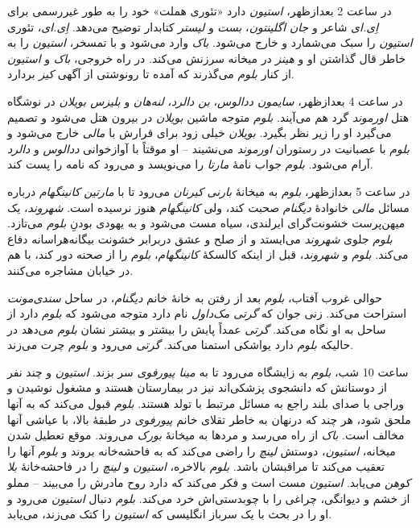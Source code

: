 \documentclass[12pt]{book}
\newcommand{\noun}[1]{\textit{\textcolor{black!70}{#1}}}
\begin{document}
    در ساعت 2 بعدازظهر، \noun{استیون} دارد «تئوری هملت» خود را به طور غیررسمی برای \noun{اِی.ای} شاعر و \noun{جان اگلینتون}، \noun{بست} و \noun{لیستر} کتابدار توضیح می‌دهد. \noun{اِی.ای}، تئوری \noun{استیون} را سبک می‌شمارد و خارج می‌شود. \noun{باک} وارد می‌شود و با تمسخر، \noun{استیون} را به خاطر قال گذاشتن او و \noun{هینز} در میخانه سرزنش می‌کند. در راه خروجی، \noun{باک} و \noun{استیون} از کنار \noun{بلوم} می‌گذرند که آمده تا رونوشتی از آگهی \noun{کیز} بردارد.

    در ساعت 4 بعدازظهر، \noun{سایمون ددالوس}، \noun{بن دالرد}، \noun{لنه‌هان} و \noun{بلیزس بویلان} در نوشگاه هتل \noun{اورموند} گرد هم می‌آیند. \noun{بلوم} متوجه ماشین \noun{بویلان} در بیرون هتل می‌شود و تصمیم می‌گیرد او را زیر نظر بگیرد. \noun{بویلان} خیلی زود برای قرارش با \noun{مالی} خارج می‌شود و \noun{بلوم} با عصبانیت در رستوران \noun{اورموند} می‌نشیند – او موقتاً با آوازخوانی \noun{ددالوس} و \noun{دالرد} آرام می‌شود. \noun{بلوم} جواب نامۀ \noun{مارتا} را می‌نویسد و می‌رود که نامه را پست کند.

    در ساعت 5 بعدازظهر، \noun{بلوم} به میخانۀ \noun{بارنی کیرنان} می‌رود تا با \noun{مارتین کانینگهام} درباره مسائل \noun{مالی} خانوادۀ \noun{دیگنام} صحبت کند، ولی \noun{کانینگهام} هنوز نرسیده است. \noun{شهروند}، یک میهن‌پرست خشونت‌گرای ایرلندی، سیاه مست می‌شود و به یهودی بودنِ \noun{بلوم} می‌تازد. \noun{بلوم} جلوی \noun{شهروند} می‌ایستد و از صلح و عشق دربرابر خشونت بیگانه‌هراسانه دفاع می‌کند. \noun{بلوم} و \noun{شهروند}، قبل از اینکه کالسکۀ \noun{کانینگهام}، \noun{بلوم} را از صحنه دور کند، با هم در خیابان مشاجره می‌کنند.

    حوالی غروب آفتاب، \noun{بلوم} بعد از رفتن به خانۀ خانم \noun{دیگنام}، در ساحل \noun{سندی‌مونت} استراحت می‌کند. زنی جوان که \noun{گرتی مک‌داول} نام دارد متوجه می‌شود که \noun{بلوم} دارد از ساحل به او نگاه می‌کند. \noun{گرتی} عمداً پایش را بیشتر و بیشتر نشان \noun{بلوم} می‌دهد در حالیکه \noun{بلوم} دارد یواشکی استمنا می‌کند. \noun{گرتی} می‌رود و \noun{بلوم} چرت می‌زند.

    ساعت 10 شب، \noun{بلوم} به زایشگاه می‌رود تا به \noun{مینا پیورفوی} سر بزند. \noun{استیون} و چند نفر از دوستانش که دانشجوی پزشکی‌اند نیز در بیمارستان هستند و مشغول نوشیدن و وراجی با صدای بلند راجع به مسائل مرتبط با تولد هستند. \noun{بلوم} قبول می‌کند که به آنها ملحق شود، هر چند که درنهان به خاطر تقلای خانم \noun{پیورفوی} در طبقۀ بالا، با عیاشی آنها مخالف است. \noun{باک} از راه می‌رسد و مردها به میخانۀ \noun{بورک} می‌روند. موقع تعطیل شدن میخانه، \noun{استیون}، دوستش \noun{لینچ} را راضی می‌کند که به فاحشه‌خانه بروند و \noun{بلوم} آنها را تعقیب می‌کند تا مراقبشان باشد.
    \noun{بلوم} بالاخره، \noun{استیون} و \noun{لینچ} را در فاحشه‌خانۀ \noun{بلا کوهن} می‌یابد. \noun{استیون} مست است و فکر می‌کند که دارد روح مادرش را می‌بیند – مملو از خشم و دیوانگی، چراغی را با چوبدستی‌اش خرد می‌کند. \noun{بلوم} دنبال \noun{استیون} می‌رود و او را در بحث با یک سرباز انگلیسی که \noun{استیون} را کتک می‌زند، می‌یابد.
\end{document}
